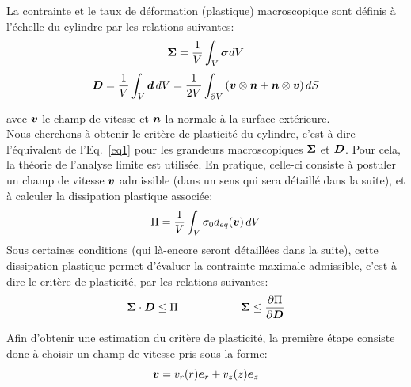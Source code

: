 \documentclass[french,english,12pt]{exam}
\begin{document}

\noindent
La contrainte et le taux de déformation (plastique) macroscopique sont définis à l'échelle du cylindre par les relations suivantes:
\begin{equation}
  \boldsymbol{\Sigma} = \frac{1}{V} \int_V \boldsymbol{\sigma} dV
\end{equation}
\begin{equation}
  \boldsymbol{D} = \frac{1}{V} \int_V \boldsymbol{d} \, dV = \frac{1}{2V} \int_{\partial V} \left(\boldsymbol{v} \otimes \boldsymbol{n} + \boldsymbol{n} \otimes \boldsymbol{v}     \right) dS
\end{equation}

\noindent
avec $\boldsymbol{v}$ le champ de vitesse et $\boldsymbol{n}$ la normale à la surface extérieure.\\

\noindent
Nous cherchons à obtenir le critère de plasticité du cylindre, c'est-à-dire l'équivalent de l'Eq.~\ref{eq1} pour les grandeurs macroscopiques $\boldsymbol{\Sigma}$ et $\boldsymbol{D}$. Pour cela, la théorie de l'analyse limite est utilisée. En pratique, celle-ci consiste à postuler un champ de vitesse $\boldsymbol{v}$ admissible (dans un sens qui sera détaillé dans la suite), et à calculer la dissipation plastique associée:
\begin{equation}
  \Pi = \frac{1}{V} \int_V \sigma_0 d_{eq}(\boldsymbol{v}) \,dV
  \label{eq3}
\end{equation}
\noindent
Sous certaines conditions (qui là-encore seront détaillées dans la suite), cette dissipation plastique permet d'évaluer la contrainte maximale admissible, c'est-à-dire le critère de plasticité, par les relations suivantes:
\begin{equation}
  \boldsymbol{\Sigma} \cdot \boldsymbol{D} \leq \Pi \hspace{2cm} \boldsymbol{\Sigma} \leq \frac{\partial \Pi}{\partial \boldsymbol{D}}
  \label{eq2}
\end{equation}

\noindent
Afin d'obtenir une estimation du critère de plasticité, la première étape consiste donc à choisir un champ de vitesse pris sous la forme:
\begin{equation}
  \boldsymbol{v} = v_r(r) \boldsymbol{e}_r + v_z(z) \boldsymbol{e}_z 
\end{equation}
\end{document}
